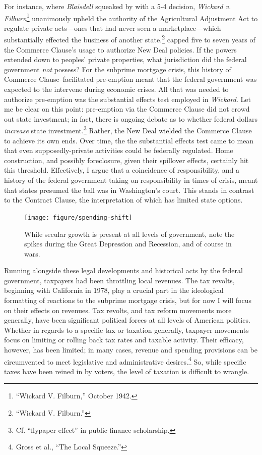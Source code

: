 \documentclass[12pt,oneside]{psthesis}
\begin{document}
For instance, where \emph{Blaisdell} squeaked by with a 5-4 decision, \emph{Wickard v. Filburn}\footnote{``Wickard V. Filburn,'' October 1942.} unanimously upheld the authority of the Agricultural Adjustment Act to regulate private acts---ones that had never seen a marketplace---which substantially effected the business of another state.\footnote{``Wickard V. Filburn.''} capped five to seven years of the Commerce Clause's usage to authorize New Deal policies.
If the powers extended down to peoples' private properties, what jurisdiction did the federal government \emph{not} possess?
For the subprime mortgage crisis, this history of Commerce Clause--facilitated pre-emption meant that the federal government was expected to the intervene during economic crises.
All that was needed to authorize pre-emption was the substantial effects test employed in \emph{Wickard}.
Let me be clear on this point: pre-emption via the Commerce Clause did not crowd out state investment; in fact, there is ongoing debate as to whether federal dollars \emph{increase} state investment.\footnote{Cf. ``flypaper effect'' in public finance scholarship.}
Rather, the New Deal wielded the Commerce Clause to achieve its own ends.
Over time, the the substantial effects test came to mean that even supposedly-private activities could be federally regulated.
Home construction, and possibly foreclosure, given their spillover effects, certainly hit this threshold.
Effectively, I argue that a coincidence of responsibility, and a history of the federal government taking on responsibility in times of crisis, meant that states presumed the ball was in Washington's court.
This stands in contrast to the Contract Clause, the interpretation of which has limited state options.
\begin{figure}

{\centering \texttt{[image: figure/spending-shift]} 

}

\caption{While secular growth is present at all levels of government, note the spikes during the Great Depression and Recession, and of course in wars.}\label{fig:spending-shift}
\end{figure}
Running alongside these legal developments and historical acts by the federal government, taxpayers had been throttling local revenues.
The tax revolts, beginning with California in 1978, play a crucial part in the ideological formatting of reactions to the subprime mortgage crisis, but for now I will focus on their effects on revenues.
Tax revolts, and tax reform movements more generally, have been significant political forces at all levels of American politics.
Whether in regards to a specific tax or taxation generally, taxpayer movements focus on limiting or rolling back tax rates and taxable activity.
Their efficacy, however, has been limited; in many cases, revenue and spending provisions can be circumvented to meet legislative and administrative desires.\footnote{Gross et al., ``The Local Squeeze.''}
So, while specific taxes have been reined in by voters, the level of taxation is difficult to wrangle.
\end{document}
